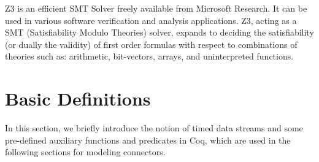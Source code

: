 \documentclass{llncs}
\begin{document}



Z3\cite{MouraB08} is an efficient SMT Solver freely available from Microsoft Research. It can be used in various software verification and analysis applications. Z3, acting as a SMT (Satisfiability Modulo Theories) solver, expands to deciding the satisfiability (or dually the validity) of first order formulas with respect to combinations of theories such as: arithmetic, bit-vectors, arrays, and uninterpreted functions.


\section{Basic Definitions}\label{sec:basicdef}

In this section, we briefly introduce the notion of timed data streams and some pre-defined auxiliary functions and predicates in Coq, which are used in the following sections for modeling connectors.
\end{document}

